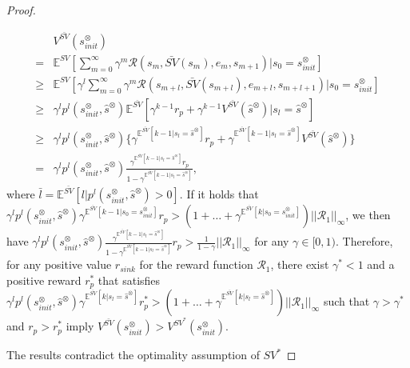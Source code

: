 \documentclass[10pt]{article}
\theoremstyle{definition}
\begin{document}
\begin{proof}
\begin{enumerate}
    \begin{align}
      & V^{\bar{SV}}(s^{\otimes}_{init}) \nonumber \\
      = & \mathbb{E}^{SV}[ {\sum_{m=0}^{\infty}} \gamma^m \mathcal{R}(s_m, \bar{SV}(s_m), e_m, s_{m+1}) | s_0 = s^{\otimes}_{init} ] \nonumber \\
      \geq & \mathbb{E}^{SV}[ \gamma^l \sum_{m=0}^{\infty} \gamma^m \mathcal{R}(s_{m+l}, \bar{SV}(s_{m+l}), e_{m+l}, s_{m+l+1}) | s_0 = s^{\otimes}_{init} ] \nonumber \\
      \geq & \gamma^l p^{l}(s^{\otimes}_{init}, \hat{s}^{\otimes}) \mathbb{E}^{\bar{SV}} [ \gamma^{k-1} r_p + \gamma^{k-1} V^{\bar{SV}}(\hat{s}^{\otimes}) | s_{l} = \hat{s}^{\otimes} ] \nonumber \\
      \geq & \gamma^l p^{l}(s^{\otimes}_{init}, \hat{s}^{\otimes}) \{ \gamma^{\mathbb{E}^{\bar{SV}}[k - 1 | s_{l} = \hat{s}^{\otimes} ]} r_p + \gamma^{\mathbb{E}^{\bar{SV}}[k - 1 | s_{l} = \hat{s}^{\otimes} ]} V^{\bar{SV}}(\hat{s}^{\otimes}) \} \nonumber \\
      = & \gamma^{l} p^{l}(s^{\otimes}_{init}, \hat{s}^{\otimes}) \frac{ \gamma^{\mathbb{E}^{\bar{SV}}[k - 1 | s_{l} = \hat{s}^{\otimes} ]} r_p } { 1 - \gamma^{\mathbb{E}^{\bar{SV}}[k - 1 | s_{l} = \hat{s}^{\otimes}]}}, \nonumber
    \end{align}
    where $\bar{l} = \mathbb{E}^{\bar{SV}}[l|p^l(s^{\otimes}_{init}, \hat{s}^{\otimes}) > 0]$.
    If it holds that $\gamma^{l} p^{l}(s^{\otimes}_{init}, \hat{s}^{\otimes}) \gamma^{\mathbb{E}^{\bar{SV}}[k - 1 | s_0 = s^{\otimes}_{init} ]} r_p > (1 + \ldots + \gamma^{\mathbb{E}^{\bar{SV}}[k | s_0 = s^{\otimes}_{init} ]} ) ||\mathcal{R}_1||_{\infty}$, we then have $ \gamma^{l} p^{l}(s^{\otimes}_{init}, \hat{s}^{\otimes}) \frac{ \gamma^{\mathbb{E}^{\bar{SV}}[k - 1 | s_{l} = \hat{s}^{\otimes} ]} } { 1 - \gamma^{\mathbb{E}^{\bar{SV}}[k - 1 | s_{l} = \hat{s}^{\otimes} ]}} r_p > \frac{1}{1-\gamma} ||\mathcal{R}_1||_{\infty}$ for any $\gamma \in [0,1)$.
    Therefore, for any positive value $r_{sink}$ for the reward function $\mathcal{R}_1$, there exist $\gamma^{\ast} < 1$ and a positive reward $r^{\ast}_p$ that satisfies $\gamma^{l} p^{l}(s^{\otimes}_{init}, \hat{s}^{\otimes}) \gamma^{\mathbb{E}^{\bar{SV}}[k | s_{l} = \hat{s}^{\otimes} ]} r^{\ast}_p > (1 + \ldots + \gamma^{\mathbb{E}^{\bar{SV}}[k | s_{l} = \hat{s}^{\otimes} ]} ) ||\mathcal{R}_1||_{\infty}$ such that $\gamma > \gamma^{\ast} $ and $r_p > r^{\ast}_p$ imply $V^{\bar{SV}}(s^{\otimes}_{init}) > V^{SV^{\ast}}(s^{\otimes}_{init})$.
  \end{enumerate}

  The results contradict the optimality assumption of $SV^{\ast}$
\end{proof}
\end{document}
